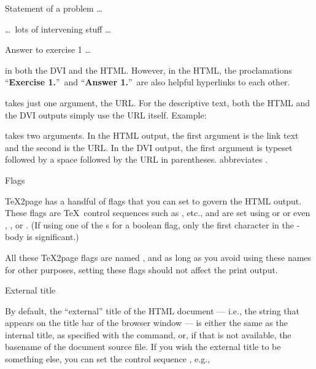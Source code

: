 \quote

 Statement of a problem \dots

\n \dots\ lots of intervening stuff \dots

 Answer to exercise 1 \dots

\endquote

\n in both the DVI and the HTML.  However, in the
HTML, the proclamations “{\bf Exercise 1.}”\ and
“{\bf Answer 1.}”\ are also helpful hyperlinks to each other.

\p{\url} takes just one argument, the URL.  For the
descriptive text, both the HTML and the DVI outputs simply
use the URL itself.   Example:


\p{\urlp} takes two arguments.  In the HTML output,
the first argument is the link text and the second is
the URL.  In the DVI output, the first argument is
typeset followed by a space followed by the URL in
parentheses.   abbreviates
.

 Flags

%
\TeX2page has a handful of flags that you can set to govern the HTML output.
These flags are \TeX\ control sequences such as \p{\TZPcolophontimestamp},
etc., and are set using \p{\let} or \p{\def} or even \p{\gdef},
\p{\edef}, or \p{\xdef}.
(If using one of the \p{\def}s for a boolean flag, only the
first character in the \p{\def}-body is significant.)

All these \TeX2page flags are named , and as long as
you avoid using these names for other purposes, setting these
flags should not affect the print output.

\beginsection External title

%
By default, the “external” title of the HTML document —
i.e., the string that appears on the title bar of the
browser window — is either the same as the internal title,
as specified with the \p{\title} command, or, if that is not
available, the basename of the document source file.  If you
wish the external title to be something else, you can set
the control sequence \p{\TZPtitle}, e.g.,

